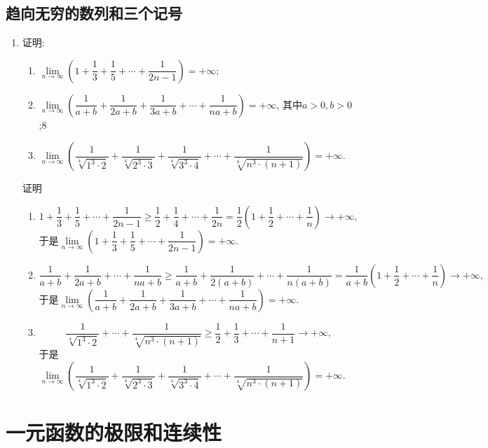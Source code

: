 \documentclass[UTF8,a4paper,20pt]{article}
\begin{document}
\subsection{趋向无穷的数列和三个记号}
\begin{enumerate}[1.]
\item 证明: 
	\begin{enumerate}[(1)]
	\item $\lim\limits_{n\to\infty}\left(1+\dfrac{1}{3}+\dfrac{1}{5}+\cdots+\dfrac{1}{2n-1}\right)=+\infty$;
	\item $\lim\limits_{n\to\infty}\left(\dfrac{1}{a+b}+\dfrac{1}{2a+b}+\dfrac{1}{3a+b}+\cdots+\dfrac{1}{na+b}\right)=+\infty$, 其中$a>0,b>0$;8
	\item $\lim\limits_{n\to\infty}\left(\dfrac{1}{\sqrt[4]{1^3\cdot2}}+\dfrac{1}{\sqrt[4]{2^3\cdot 3}}+\dfrac{1}{\sqrt[4]{3^3\cdot 4}}+\cdots+\dfrac{1}{\sqrt[4]{n^3\cdot(n+1)}}\right)=+\infty$.
	\end{enumerate}

{\heiti 证明}
	\begin{enumerate}[(1)]
	\item \[1+\dfrac{1}{3}+\dfrac{1}{5}+\cdots+\dfrac{1}{2n-1}\geqslant\dfrac{1}{2}+\dfrac{1}{4}+\cdots+\dfrac{1}{2n}=\dfrac{1}{2}\left(1+\dfrac{1}{2}+\cdots+\dfrac{1}{n}\right)\to+\infty,\] 
于是$\lim\limits_{n\to\infty}\left(1+\dfrac{1}{3}+\dfrac{1}{5}+\cdots+\dfrac{1}{2n-1}\right)=+\infty$.
	\item \[\dfrac{1}{a+b}+\dfrac{1}{2a+b}+\cdots+\dfrac{1}{na+b}\geqslant\dfrac{1}{a+b}+\dfrac{1}{2(a+b)}+\cdots+\dfrac{1}{n(a+b)}=\frac{1}{a+b}\left(1+\dfrac{1}{2}+\cdots+\dfrac{1}{n}\right)\to+\infty,\]
于是$\lim\limits_{n\to\infty}\left(\dfrac{1}{a+b}+\dfrac{1}{2a+b}+\dfrac{1}{3a+b}+\cdots+\dfrac{1}{na+b}\right)=+\infty$.
	\item \[\dfrac{1}{\sqrt[4]{1^3\cdot2}}+\cdots+\dfrac{1}{\sqrt[4]{n^3\cdot(n+1)}}\geqslant\dfrac{1}{2}+\dfrac{1}{3}+\cdots+\dfrac{1}{n+1}\to +\infty,\]
于是$\lim\limits_{n\to\infty}\left(\dfrac{1}{\sqrt[4]{1^3\cdot2}}+\dfrac{1}{\sqrt[4]{2^3\cdot 3}}+\dfrac{1}{\sqrt[4]{3^3\cdot 4}}+\cdots+\dfrac{1}{\sqrt[4]{n^3\cdot(n+1)}}\right)=+\infty$.
	\end{enumerate}
\end{enumerate}

\clearpage
\section{一元函数的极限和连续性}
\end{document}
